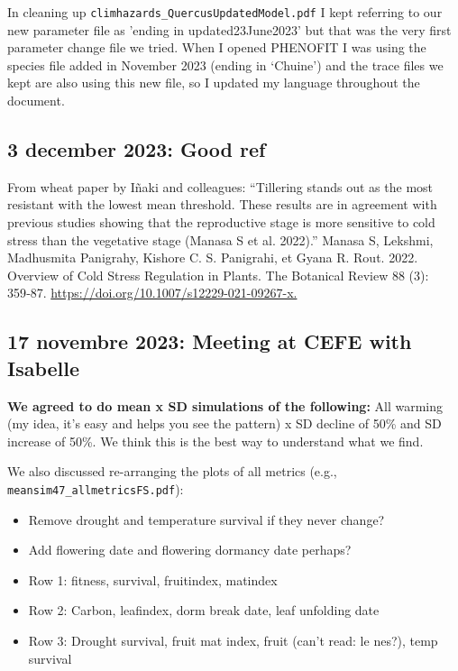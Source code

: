 \documentclass[11pt,letter]{article}
\begin{document}
In cleaning up \verb|climhazards_QuercusUpdatedModel.pdf| I kept referring to our new parameter file as 'ending in updated23June2023' but that was the very first parameter change file we tried. When I opened PHENOFIT I was using the species file added in November 2023 (ending in `Chuine') and the trace files we kept are also using this new file, so I updated my language throughout the document. 

\subsection{3 december 2023: Good ref}

From wheat paper by I\~naki and colleagues: ``Tillering stands out as the most resistant with the lowest mean threshold. These results are in agreement with previous studies showing that the reproductive stage is more sensitive to cold stress than the vegetative stage (Manasa S et al. 2022).''  Manasa S, Lekshmi, Madhusmita Panigrahy, Kishore C. S. Panigrahi, et Gyana R. Rout. 2022. Overview of Cold Stress Regulation in Plants. The Botanical Review 88 (3): 359‑87. \url{https://doi.org/10.1007/s12229-021-09267-x.}

\subsection{17 novembre 2023: Meeting at CEFE with Isabelle} %

{\bf We agreed to do mean x SD simulations of the following:} All warming (my idea, it's easy and helps you see the pattern) x SD decline of 50\% and SD increase of 50\%. We think this is the best way to understand what we find. 

We also discussed re-arranging the plots of all metrics (e.g., \verb|meansim47_allmetricsFS.pdf|): 
\begin{itemize}
\item Remove drought and temperature survival if they never change?
\item Add flowering date and flowering dormancy date perhaps?
\item Row 1: fitness, survival, fruitindex, matindex
\item Row 2: Carbon, leafindex, dorm break date, leaf unfolding date
\item Row 3: Drought survival, fruit mat index, fruit (can't read: le nes?), temp survival
\end{itemize}
\end{document}
